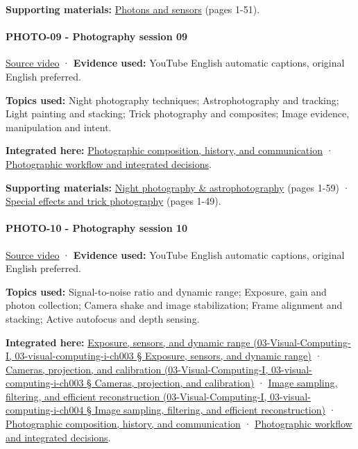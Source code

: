 \textbf{Supporting materials:} \href{https://drive.google.com/open?id=0B6w2XfPHEcZYell0Tkt2YjkwYWc}{Photons and sensors} (pages 1-51).

\paragraph{PHOTO-09 - Photography session 09}\label{photo-09---photography-session-09}

\href{https://www.youtube.com/watch?v=1ah8EEqfFsM}{Source video} · \textbf{Evidence used:} YouTube English automatic captions, original English preferred.

\textbf{Topics used:} Night photography techniques; Astrophotography and tracking; Light painting and stacking; Trick photography and composites; Image evidence, manipulation and intent.

\textbf{Integrated here:} \hyperref[04-visual-computing-ii-ch034]{Photographic composition, history, and communication} · \hyperref[04-visual-computing-ii-ch034]{Photographic workflow and integrated decisions}.

\textbf{Supporting materials:} \href{https://drive.google.com/open?id=0B6w2XfPHEcZYaTJ5M2RhZzBwWTg}{Night photography \& astrophotography} (pages 1-59) · \href{https://drive.google.com/open?id=0B6w2XfPHEcZYdklBY3BfVTFSSnM}{Special effects and trick photography} (pages 1-49).

\paragraph{PHOTO-10 - Photography session 10}\label{photo-10---photography-session-10}

\href{https://www.youtube.com/watch?v=ia9w4ZtdULs}{Source video} · \textbf{Evidence used:} YouTube English automatic captions, original English preferred.

\textbf{Topics used:} Signal-to-noise ratio and dynamic range; Exposure, gain and photon collection; Camera shake and image stabilization; Frame alignment and stacking; Active autofocus and depth sensing.

\textbf{Integrated here:} \href{}{Exposure, sensors, and dynamic range (03-Visual-Computing-I, 03-visual-computing-i-ch003 § Exposure, sensors, and dynamic range)} · \href{}{Cameras, projection, and calibration (03-Visual-Computing-I, 03-visual-computing-i-ch003 § Cameras, projection, and calibration)} · \href{}{Image sampling, filtering, and efficient reconstruction (03-Visual-Computing-I, 03-visual-computing-i-ch004 § Image sampling, filtering, and efficient reconstruction)} · \hyperref[04-visual-computing-ii-ch034]{Photographic composition, history, and communication} · \hyperref[04-visual-computing-ii-ch034]{Photographic workflow and integrated decisions}.

